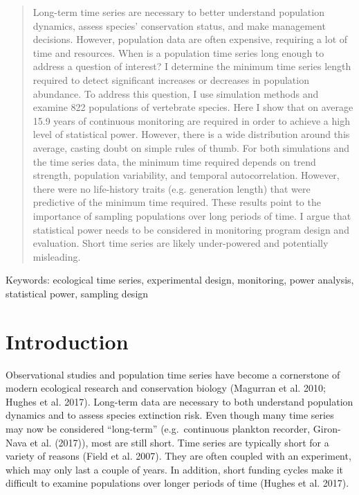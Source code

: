 \documentclass[12pt,]{article}
\begin{document}
\begin{spacing}{2} 

\linenumbers

\begin{abstract}
Long-term time series are necessary to better understand population dynamics, assess species' conservation status, and make management decisions. However, population data are often expensive, requiring a lot of time and resources. When is a population time series long enough to address a question of interest? I determine the minimum time series length required to detect significant increases or decreases in population abundance. To address this question, I use simulation methods and examine 822 populations of vertebrate species. Here I show that on average 15.9 years of continuous monitoring are required in order to achieve a high level of statistical power. However, there is a wide distribution around this average, casting doubt on simple rules of thumb. For both simulations and the time series data, the minimum time required depends on trend strength, population variability, and temporal autocorrelation. However, there were no life-history traits (e.g. generation length) that were predictive of the minimum time required. These results point to the importance of sampling populations over long periods of time. I argue that statistical power needs to be considered in monitoring program design and evaluation. Short time series are likely under-powered and potentially misleading.
\end{abstract}

Keywords: ecological time series, experimental design, monitoring, power
analysis, statistical power, sampling design

\section{Introduction}\label{introduction}

Observational studies and population time series have become a
cornerstone of modern ecological research and conservation biology
(Magurran et al. 2010; Hughes et al. 2017). Long-term data are necessary
to both understand population dynamics and to assess species extinction
risk. Even though many time series may now be considered ``long-term''
(e.g.~continuous plankton recorder, Giron-Nava et al. (2017)), most are
still short. Time series are typically short for a variety of reasons
(Field et al. 2007). They are often coupled with an experiment, which
may only last a couple of years. In addition, short funding cycles make
it difficult to examine populations over longer periods of time (Hughes
et al. 2017).


\end{spacing}
\end{document}
